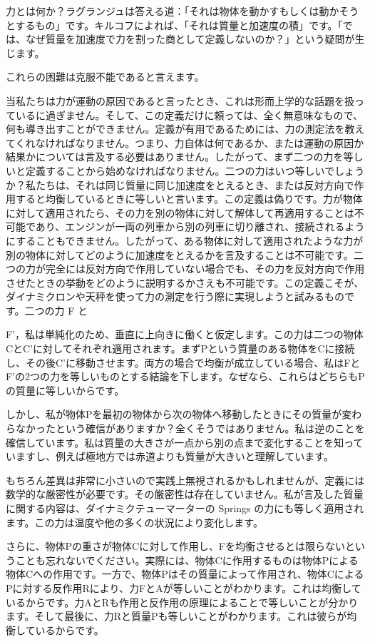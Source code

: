 \documentclass[a4paper,11pt,openany]{ltjsbook}
\begin{document}
力とは何か？ラグランジュは答える道：「それは物体を動かすもしくは動かそうとするもの」です。キルコフによれば、「それは質量と加速度の積」です。「では、なぜ質量を加速度で力を割った商として定義しないのか？」という疑問が生じます。

これらの困難は克服不能であると言えます。

当私たちは力が運動の原因であると言ったとき、これは形而上学的な話題を扱っているに過ぎません。そして、この定義だけに頼っては、全く無意味なもので、何も導き出すことができません。定義が有用であるためには、力の測定法を教えてくれなければなりません。つまり、力自体は何であるか、または運動の原因か結果かについては言及する必要はありません。したがって、まず二つの力を等しいと定義することから始めなければなりません。二つの力はいつ等しいでしょうか？私たちは、それは同じ質量に同じ加速度をとえるとき、または反対方向で作用すると均衡しているときに等しいと言います。この定義は偽りです。力が物体に対して適用されたら、その力を別の物体に対して解体して再適用することは不可能であり、エンジンが一両の列車から別の列車に切り離され、接続されるようにすることもできません。したがって、ある物体に対して適用されたような力が別の物体に対してどのように加速度をとえるかを言及することは不可能です。二つの力が完全には反対方向で作用していない場合でも、その力を反対方向で作用させたときの挙動をどのように説明するかさえも不可能です。この定義こそが、ダイナミクロンや天秤を使って力の測定を行う際に実現しようと試みるものです。二つの力 F と

F'，私は単純化のため、垂直に上向きに働くと仮定します。この力は二つの物体CとC'に対してそれぞれ適用されます。まずPという質量のある物体をCに接続し、その後C'に移動させます。両方の場合で均衡が成立している場合、私はFとF'の2つの力を等しいものとする結論を下します。なぜなら、これらはどちらもPの質量に等しいからです。

しかし、私が物体Pを最初の物体から次の物体へ移動したときにその質量が変わらなかったという確信がありますか？全くそうではありません。私は逆のことを確信しています。私は質量の大きさが一点から別の点まで変化することを知っていますし、例えば極地方では赤道よりも質量が大きいと理解しています。

もちろん差異は非常に小さいので実践上無視されるかもしれませんが、定義には数学的な厳密性が必要です。その厳密性は存在していません。私が言及した質量に関する内容は、ダイナミクテューマーターの Springs の力にも等しく適用されます。この力は温度や他の多くの状況により変化します。

さらに、物体Pの重さが物体Cに対して作用し、Fを均衡させるとは限らないということも忘れないでください。実際には、物体Cに作用するものは物体Pによる物体Cへの作用です。一方で、物体Pはその質量によって作用され、物体CによるPに対する反作用Rにより、力FとAが等しいことがわかります。これは均衡しているからです。力AとRも作用と反作用の原理によることで等しいことが分かります。そして最後に、力Rと質量Pも等しいことがわかります。これは彼らが均衡しているからです。
\end{document}
